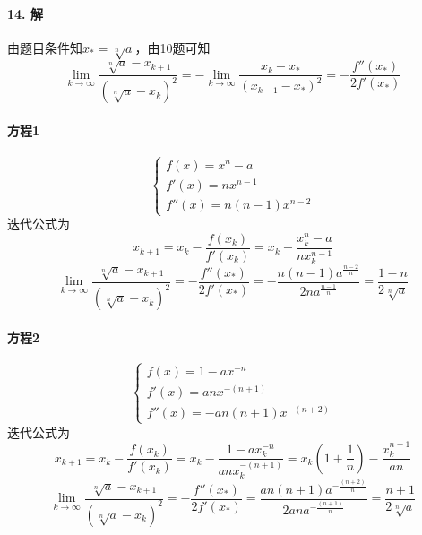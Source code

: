 \paragraph{14. 解}

由题目条件知$x_* = \sqrt[n]{a}$，由10题可知
\[\lim_{k \to \infty} \frac{\sqrt[n]{a} - x_{k + 1}}{(\sqrt[n]{a} - x_k)^2} = -\lim_{k \to \infty} \frac{x_{k} - x_*}{(x_{k - 1} - x_*)^2} = -\frac{f''(x_*)}{2f'(x_*)}\]

\paragraph{方程1}
\[\begin{cases}
f(x) = x^n - a \\
f'(x) = nx^{n - 1} \\
f''(x) = n(n - 1)x^{n - 2}
\end{cases}\]
迭代公式为
\[x_{k + 1} = x_k - \frac{f(x_k)}{f'(x_k)} = x_k - \frac{x_k^n - a}{nx_k^{n - 1}}\]
\[\lim_{k \to \infty} \frac{\sqrt[n]{a} - x_{k + 1}}{(\sqrt[n]{a} - x_k)^2} = -\frac{f''(x_*)}{2f'(x_*)} = -\frac{n(n - 1)a^{\frac{n - 2}{n}}}{2na^{\frac{n - 1}{n}}} = \frac{1 - n}{2\sqrt[n]{a}}\]

\paragraph{方程2}
\[\begin{cases}
f(x) = 1 - ax^{-n} \\
f'(x) = anx^{-(n + 1)} \\
f''(x) = -an(n + 1)x^{-(n + 2)}
\end{cases}\]
迭代公式为
\[x_{k + 1} = x_k - \frac{f(x_k)}{f'(x_k)} = x_k - \frac{1 - ax_k^{-n}}{anx_k^{-(n + 1)}} = x_k(1 + \frac{1}{n}) - \frac{x_k^{n + 1}}{an}\]
\[\lim_{k \to \infty} \frac{\sqrt[n]{a} - x_{k + 1}}{(\sqrt[n]{a} - x_k)^2} = -\frac{f''(x_*)}{2f'(x_*)} = \frac{an(n + 1)a^{-\frac{(n + 2)}{n}}}{2ana^{-\frac{(n + 1)}{n}}} = \frac{n + 1}{2\sqrt[n]{a}}\]

